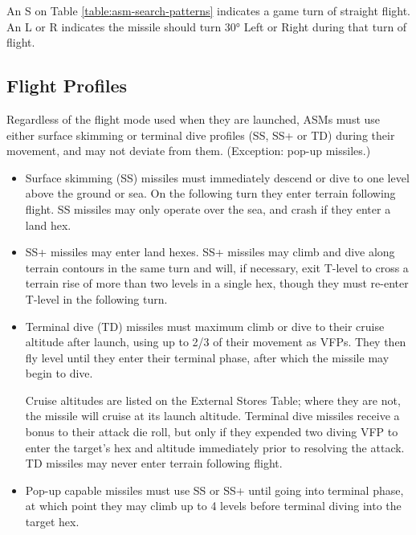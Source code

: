 \begin{advancedrules}
\begin{itemize}
            An S on Table \ref{table:asm-search-patterns} indicates a game turn of straight flight.  An L or R indicates the missile should turn 30° Left or Right during that turn of flight.

            

    \end{itemize}

    \subsection{Flight Profiles}  Regardless of the flight mode used when they are launched, ASMs must use either surface skimming or terminal dive profiles (SS, SS+ or TD) during their movement, and may not deviate from them.  (Exception: pop-up missiles.)

    \begin{itemize}

        \item Surface skimming (SS) missiles must immediately descend or dive to one level above the ground or sea.  On the following turn they enter terrain following flight.  SS missiles may only operate over the sea, and crash if they enter a land hex.

        \item SS+ missiles may enter land hexes.  SS+ missiles may climb and dive along terrain contours in the same turn and will, if necessary, exit T-level to cross a terrain rise of more than two levels in a single hex, though they must re-enter T-level in the following turn.

        \item Terminal dive (TD) missiles must maximum climb or dive to their cruise altitude after launch, using up to 2/3 of their movement as VFPs.  They then fly level until they enter their terminal phase, after which the missile may begin to dive.

            Cruise altitudes are listed on the External Stores Table; where they are not, the missile will cruise at its launch altitude. Terminal dive missiles receive a bonus to their attack die roll, but only if they expended two diving VFP to enter the target's hex and altitude immediately prior to resolving the attack.  TD missiles may never enter terrain following flight.

        \item Pop-up capable missiles must use SS or SS+ until going into terminal phase, at which point they may climb up to 4 levels before terminal diving into the target hex.


\end{itemize}
\end{advancedrules}
